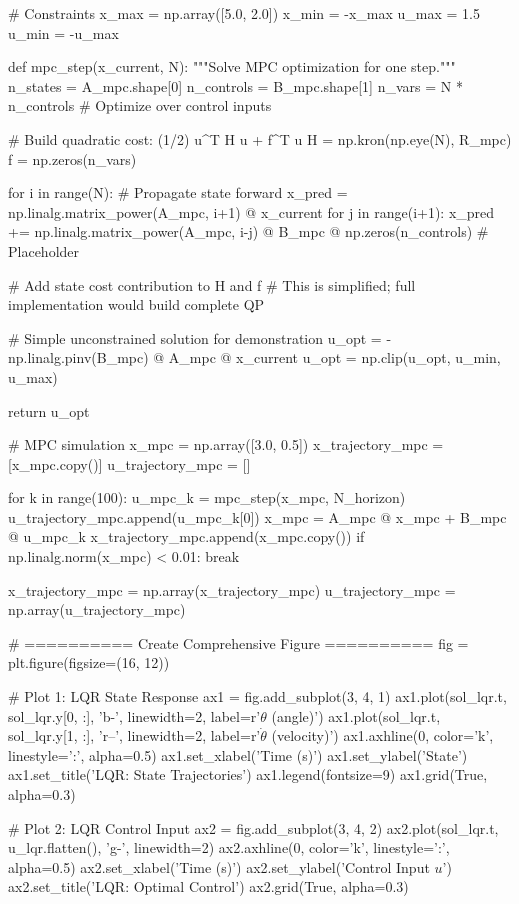 \documentclass[a4paper, 11pt]{article}
\begin{document}
\begin{pycode}
# Constraints
x_max = np.array([5.0, 2.0])
x_min = -x_max
u_max = 1.5
u_min = -u_max

def mpc_step(x_current, N):
    """Solve MPC optimization for one step."""
    n_states = A_mpc.shape[0]
    n_controls = B_mpc.shape[1]
    n_vars = N * n_controls  # Optimize over control inputs

    # Build quadratic cost: (1/2) u^T H u + f^T u
    H = np.kron(np.eye(N), R_mpc)
    f = np.zeros(n_vars)

    for i in range(N):
        # Propagate state forward
        x_pred = np.linalg.matrix_power(A_mpc, i+1) @ x_current
        for j in range(i+1):
            x_pred += np.linalg.matrix_power(A_mpc, i-j) @ B_mpc @ np.zeros(n_controls)  # Placeholder

        # Add state cost contribution to H and f
        # This is simplified; full implementation would build complete QP

    # Simple unconstrained solution for demonstration
    u_opt = -np.linalg.pinv(B_mpc) @ A_mpc @ x_current
    u_opt = np.clip(u_opt, u_min, u_max)

    return u_opt

# MPC simulation
x_mpc = np.array([3.0, 0.5])
x_trajectory_mpc = [x_mpc.copy()]
u_trajectory_mpc = []

for k in range(100):
    u_mpc_k = mpc_step(x_mpc, N_horizon)
    u_trajectory_mpc.append(u_mpc_k[0])
    x_mpc = A_mpc @ x_mpc + B_mpc @ u_mpc_k
    x_trajectory_mpc.append(x_mpc.copy())
    if np.linalg.norm(x_mpc) < 0.01:
        break

x_trajectory_mpc = np.array(x_trajectory_mpc)
u_trajectory_mpc = np.array(u_trajectory_mpc)

# ========== Create Comprehensive Figure ==========
fig = plt.figure(figsize=(16, 12))

# Plot 1: LQR State Response
ax1 = fig.add_subplot(3, 4, 1)
ax1.plot(sol_lqr.t, sol_lqr.y[0, :], 'b-', linewidth=2, label=r'$\theta$ (angle)')
ax1.plot(sol_lqr.t, sol_lqr.y[1, :], 'r--', linewidth=2, label=r'$\dot{\theta}$ (velocity)')
ax1.axhline(0, color='k', linestyle=':', alpha=0.5)
ax1.set_xlabel('Time (s)')
ax1.set_ylabel('State')
ax1.set_title('LQR: State Trajectories')
ax1.legend(fontsize=9)
ax1.grid(True, alpha=0.3)

# Plot 2: LQR Control Input
ax2 = fig.add_subplot(3, 4, 2)
ax2.plot(sol_lqr.t, u_lqr.flatten(), 'g-', linewidth=2)
ax2.axhline(0, color='k', linestyle=':', alpha=0.5)
ax2.set_xlabel('Time (s)')
ax2.set_ylabel('Control Input $u$')
ax2.set_title('LQR: Optimal Control')
ax2.grid(True, alpha=0.3)


\end{pycode}
\end{document}
